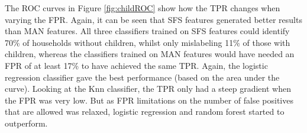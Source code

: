 %
\childMat

\childROC
The ROC curves in Figure \ref{fig:childROC} show how the TPR changes when varying the FPR. Again, it can be seen that SFS features generated better results than MAN features. All three classifiers trained on SFS features could identify 70\% of households without children, whilst only mislabeling 11\% of those with children, whereas the classifiers trained on MAN features would have needed an FPR of at least 17\% to have achieved the same TPR. Again, the logistic regression classifier gave the best performance (based on the area under the curve). Looking at the Knn classifier, the TPR only had a steep gradient when the FPR was very low.  But as FPR limitations on the number of false positives that are allowed was relaxed, logistic regression and random forest started to outperform.


